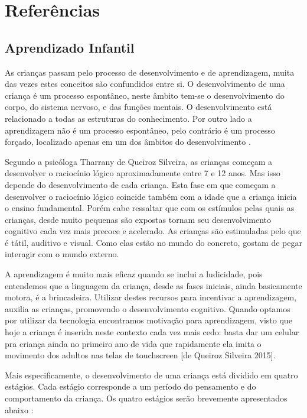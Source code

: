 \chapter[Referências]{Referências}

\section{Aprendizado Infantil}

As crianças passam pelo processo de desenvolvimento e de aprendizagem, muita das vezes estes conceitos são confundidos
entre si. O desenvolvimento de uma criança é um processo espontâneo, neste âmbito tem-se o desenvolvimento do corpo, do
sistema nervoso, e das funções mentais. O desenvolvimento está relacionado a todas as estruturas do conhecimento. Por
outro lado a aprendizagem não é um processo espontâneo, pelo contrário é um processo forçado, localizado apenas em um
dos âmbitos do desenvolvimento \cite{piaget:1972}.

Segundo a psicóloga Tharrany de Queiroz Silveira, as crianças começam a desenvolver o raciocínio lógico aproximadamente
entre 7 e 12 anos. Mas isso depende do desenvolvimento de cada criança. Esta fase em que começam a desenvolver o
raciocínio lógico coincide também com a idade que a criança inicia o ensino fundamental. Porém cabe ressaltar que com
os estímulos pelas quais as crianças, desde muito pequenas são expostas tornam seu desenvolvimento cognitivo cada vez
mais precoce e acelerado. As crianças são estimuladas pelo que é tátil, auditivo e visual. Como elas estão no mundo do
concreto, gostam de pegar interagir com o mundo externo.

A aprendizagem é muito mais eficaz quando se inclui a ludicidade, pois entendemos que a linguagem da criança, desde as
fases iniciais, ainda basicamente motora, é a brincadeira. Utilizar destes recursos para incentivar a aprendizagem,
auxilia as crianças, promovendo o desenvolvimento cognitivo. Quando optamos por utilizar da
tecnologia encontramos motivação para aprendizagem, visto que hoje a criança é inserida neste contexto cada vez mais
cedo: basta dar um celular pra criança ainda no primeiro ano de vida que rapidamente ela imita o movimento dos adultos
nas telas de touchscreen [de Queiroz Silveira 2015].

Mais especificamente, o desenvolvimento de uma criança está dividido em quatro estágios. Cada estágio corresponde a um
período do pensamento e do comportamento da criança. Os quatro estágios serão brevemente apresentados abaixo \cite{piaget:1972}:

